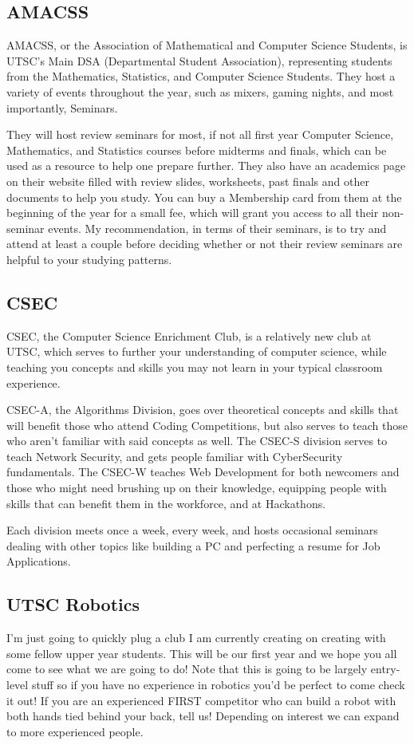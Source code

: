 \documentclass[11pt]{article}
\begin{document}
\subsection{AMACSS}
AMACSS, or the Association of Mathematical and Computer Science Students, is UTSC's Main DSA (Departmental Student Association), representing students from the Mathematics, Statistics, and Computer Science Students.  They host a variety of events throughout the year, such as mixers, gaming nights, and most importantly, Seminars.\par
They will host review seminars for most, if not all first year Computer Science, Mathematics, and Statistics courses before midterms and finals, which can be used as a resource to help one prepare further. They also have an academics page on their website filled with review slides, worksheets, past finals and other documents to help you study. You can buy a Membership card from them at the beginning of the year for a small fee, which will grant you access to all their non-seminar events.  My recommendation, in terms of their seminars, is to try and attend at least a couple before deciding whether or not their review seminars are helpful to your studying patterns.

\subsection{CSEC}
CSEC, the Computer Science Enrichment Club, is a relatively new club at UTSC, which serves to further your understanding of computer science, while teaching you concepts and skills you may not learn in your typical classroom experience.\par
CSEC-A, the Algorithms Division, goes over theoretical concepts and skills that will benefit those who attend Coding Competitions, but also serves to teach those who aren't familiar with said concepts as well.  The CSEC-S division serves to teach Network Security, and gets people familiar with CyberSecurity fundamentals.  The CSEC-W teaches Web Development for both newcomers and those who might need brushing up on their knowledge, equipping people with skills that can benefit them in the workforce, and at Hackathons.\par
Each division meets once a week, every week, and hosts occasional seminars dealing with other topics like building a PC and perfecting a resume for Job Applications.

\subsection{UTSC Robotics}
I'm just going to quickly plug a club I am currently creating on creating with some fellow upper year students. This will be our first year and we hope you all come to see what we are going to do! Note that this is going to be largely entry-level stuff so if you have no experience in robotics you'd be perfect to come check it out! If you are an experienced FIRST competitor who can build a robot with both hands tied behind your back, tell us! Depending on interest we can expand to more experienced people.
\end{document}
